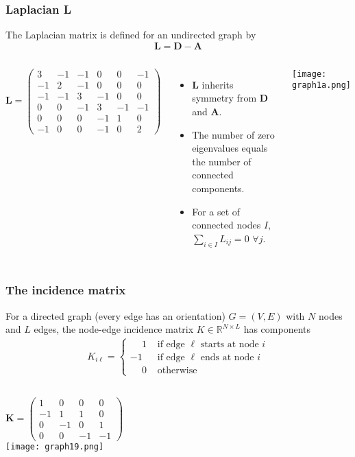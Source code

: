\documentclass[10pt,aspectratio=169,dvipsnames]{beamer}
\newcommand{\R}{\mathbb{R}}
\let\olditem\item
\renewcommand{\item}{%
\olditem\vspace{5pt}}
\begin{document}
\begin{frame}
  \frametitle{Laplacian L}
  The \alert{Laplacian matrix} is defined for an undirected graph by
\begin{equation*}
\mathbf{L} = \mathbf{D} - \mathbf{A}
\end{equation*}
\begin{columns}
\begin{equation*}
\mathbf{L}=\left(\begin{matrix}
3 & -1 & -1 & 0 & 0 & -1\\
-1 & 2 & -1 & 0 & 0 & 0\\
-1 & -1 & 3 & -1 & 0 & 0\\
0 & 0 & -1 & 3 & -1 & -1\\
0 & 0 & 0 & -1 & 1 & 0\\
-1 & 0 & 0 & -1 & 0 & 2
\end{matrix}\right)
\end{equation*}
\begin{itemize}
\item $\mathbf{L}$ inherits symmetry from $\mathbf{D}$ and $\mathbf{A}$.
\item The number of zero eigenvalues equals the number of connected components.
\item For a set of connected nodes $I$, $\sum_{i\in I} L_{ij} = 0$  $\forall j$.
\end{itemize}
\texttt{[image: graph1a.png]}
  \end{columns}
\end{frame}


\begin{frame}
  \frametitle{The incidence matrix}

  For a directed graph (every edge has an orientation) $G=(V,E)$ with
$N$ nodes and $L$ edges, the node-edge \alert{incidence matrix}
$K\in\R^{N\times L}$ has components
\begin{align*}
K_{i\ell} = \begin{cases}
\phantom{-} 1 & \text{ if edge $\ell$ starts at node $i$} \\
-1 & \text{ if edge $\ell$ ends at node $i$} \\
\phantom{-} 0 & \text{ otherwise}
\end{cases}
\end{align*}
\begin{columns}
\begin{equation*}
\mathbf{K}=\left(\begin{matrix}
1 & 0 & 0 & 0\\
-1 & 1 & 1 & 0\\
0 & -1 & 0 & 1\\
0 & 0 & -1 & -1
\end{matrix}\right)
\end{equation*}
\texttt{[image: graph19.png]}
\end{columns}
\end{frame}
\end{document}
